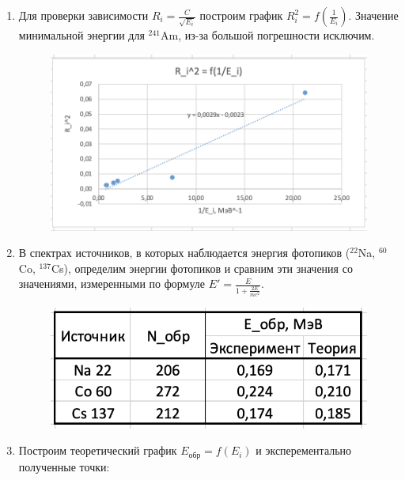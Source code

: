 \documentclass[a4paper, 12pt]{article}%
\begin{document}
\begin{enumerate}
	\item Для проверки зависимости $R_i = \frac{C}{\sqrt{E_i}}$ построим график $R_i^2 = f(\frac{1}{E_i})$. Значение минимальной энергии для $^{241}$Am,  из-за большой погрешности исключим.
	
\begin{figure}[h!]
	\centering
	\includegraphics[scale=0.85]{График_3.PNG}
\end{figure}

	\item В спектрах источников, в которых наблюдается энергия фотопиков ($^{22}$Na,  $^{60}$Co,  $^{137}$Cs),  определим энергии фотопиков и сравним эти значения со значениями,  измеренными по формуле $E' = \frac{E}{1 + \frac{2E}{mc^2}}$.

\newpage
	
\begin{figure}[h!]
	\centering
	\includegraphics[scale=0.85]{Таблица_3.PNG}
\end{figure}

	\item Построим теоретический график $E_{\text{обр}} = f(E_i)$ и эксперементально полученные точки:


\end{enumerate}
\end{document}
